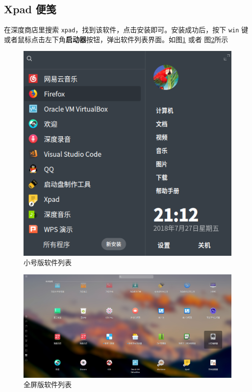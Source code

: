 \documentclass[doctor,openright,twoside]{sjtuthesis}
\newcommand{\passthrough}[1]{#1}
\theoremstyle{plain}
\theoremstyle{definition}
\theoremstyle{remark}
\theoremstyle{ocrenumbox}
\theoremstyle{plain}
\begin{document}
\hypertarget{xpad-}{%
\subsection{Xpad 便笺}\label{xpad-}}

在深度商店里搜索
\passthrough{\lstinline!xpad!}，找到该软件，点击安装即可。安装成功后，按下
\passthrough{\lstinline!win!}
键或者鼠标点击左下角\textbf{启动器}按钮，弹出软件列表界面。如图\ref{fig:xpad-smallscreen}
或者 图\ref{fig:xpad-fullscreen}所示

\begin{figure}

{\centering \includegraphics[width=0.618\linewidth]{images/education-xpad-search-smallscreen} 

}

\caption[小号版软件列表]{小号版软件列表}\label{fig:xpad-smallscreen}
\end{figure}

\begin{figure}

{\centering \includegraphics[width=1\linewidth]{images/education-xpad-search-fullscreen} 

}

\caption[全屏版软件列表]{全屏版软件列表}\label{fig:xpad-fullscreen}
\end{figure}
\end{document}
